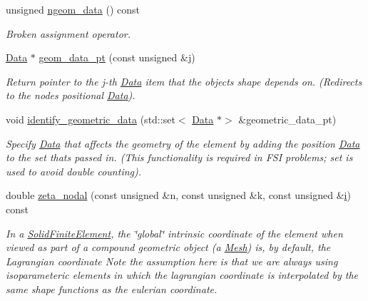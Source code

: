 \begin{DoxyCompactItemize}
unsigned \hyperlink{classoomph_1_1SolidFiniteElement_a73f387da7f31f233b79c2526e8cbc896}{ngeom\+\_\+data} () const
\begin{DoxyCompactList}\small\item\em Broken assignment operator. \end{DoxyCompactList}\item 
\hyperlink{classoomph_1_1Data}{Data} $\ast$ \hyperlink{classoomph_1_1SolidFiniteElement_a2457ad75b45257b536090d9b1a6f1331}{geom\+\_\+data\+\_\+pt} (const unsigned \&j)
\begin{DoxyCompactList}\small\item\em Return pointer to the j-\/th \hyperlink{classoomph_1_1Data}{Data} item that the object\textquotesingle{}s shape depends on. (Redirects to the nodes\textquotesingle{} positional \hyperlink{classoomph_1_1Data}{Data}). \end{DoxyCompactList}\item 
void \hyperlink{classoomph_1_1SolidFiniteElement_a389e4773864d19ac82337ffc24e4dfa6}{identify\+\_\+geometric\+\_\+data} (std\+::set$<$ \hyperlink{classoomph_1_1Data}{Data} $\ast$$>$ \&geometric\+\_\+data\+\_\+pt)
\begin{DoxyCompactList}\small\item\em Specify \hyperlink{classoomph_1_1Data}{Data} that affects the geometry of the element by adding the position \hyperlink{classoomph_1_1Data}{Data} to the set that\textquotesingle{}s passed in. (This functionality is required in F\+SI problems; set is used to avoid double counting). \end{DoxyCompactList}\item 
double \hyperlink{classoomph_1_1SolidFiniteElement_a4a377d7acaa7fbe444a65ed3d4a79bed}{zeta\+\_\+nodal} (const unsigned \&n, const unsigned \&k, const unsigned \&\hyperlink{cfortran_8h_adb50e893b86b3e55e751a42eab3cba82}{i}) const
\begin{DoxyCompactList}\small\item\em In a \hyperlink{classoomph_1_1SolidFiniteElement}{Solid\+Finite\+Element}, the \char`\"{}global\char`\"{} intrinsic coordinate of the element when viewed as part of a compound geometric object (a \hyperlink{classoomph_1_1Mesh}{Mesh}) is, by default, the Lagrangian coordinate Note the assumption here is that we are always using isoparameteric elements in which the lagrangian coordinate is interpolated by the same shape functions as the eulerian coordinate. \end{DoxyCompactList}\item 
$$
\end{DoxyCompactItemize}
